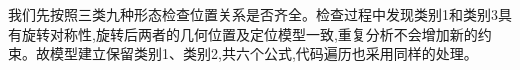 我们先按照三类九种形态检查位置关系是否齐全。检查过程中发现类别1和类别3具有旋转对称性,旋转后两者的几何位置及定位模型一致,重复分析不会增加新的约束。故模型建立保留类别1、类别2,共六个公式,代码遍历也采用同样的处理。
